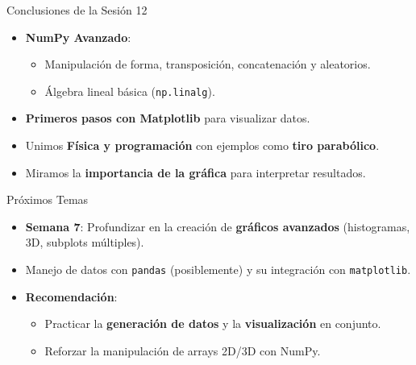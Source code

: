 \documentclass[10pt]{beamer}
\begin{document}
\begin{frame}{Conclusiones de la Sesión 12}
  \begin{itemize}
    \item \textbf{NumPy Avanzado}:
      \begin{itemize}
        \item Manipulación de forma, transposición, concatenación y aleatorios.
        \item Álgebra lineal básica (\texttt{np.linalg}).
      \end{itemize}
    \item \textbf{Primeros pasos con Matplotlib} para visualizar datos.
    \item Unimos \textbf{Física y programación} con ejemplos como \textbf{tiro parabólico}.
    \item Miramos la \textbf{importancia de la gráfica} para interpretar resultados.
  \end{itemize}
\end{frame}

\begin{frame}{Próximos Temas}
  \begin{itemize}
    \item \textbf{Semana 7}: Profundizar en la creación de \textbf{gráficos avanzados} (histogramas, 3D, subplots múltiples).
    \item Manejo de datos con \texttt{pandas} (posiblemente) y su integración con \texttt{matplotlib}.
    \item \textbf{Recomendación}:
      \begin{itemize}
        \item Practicar la \textbf{generación de datos} y la \textbf{visualización} en conjunto.
        \item Reforzar la manipulación de arrays 2D/3D con NumPy.
      \end{itemize}
  \end{itemize}
\end{frame}
\end{document}
